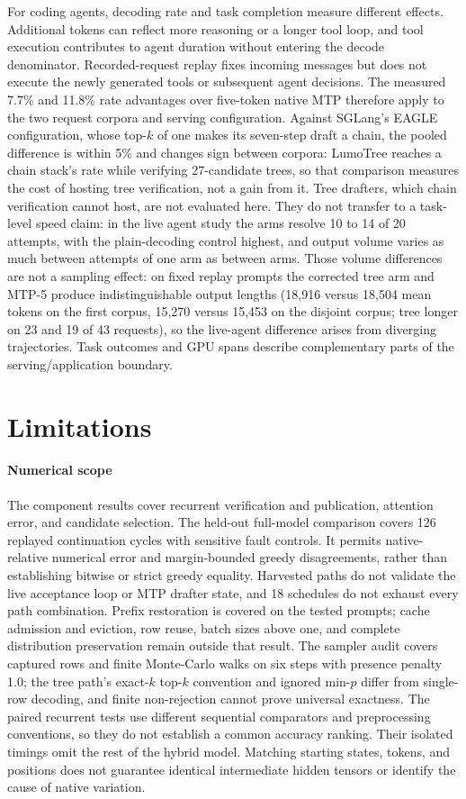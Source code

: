 \documentclass[conference]{IEEEtran}
\newcommand{\sys}{LumoTree}
\begin{document}
For coding agents, decoding rate and task completion measure different effects. Additional tokens can reflect more reasoning or a longer tool loop, and tool execution contributes to agent duration without entering the decode denominator. Recorded-request replay fixes incoming messages but does not execute the newly generated tools or subsequent agent decisions. The measured 7.7\% and 11.8\% rate advantages over five-token native MTP therefore apply to the two request corpora and serving configuration. Against SGLang's EAGLE configuration, whose top-$k$ of one makes its seven-step draft a chain, the pooled difference is within 5\% and changes sign between corpora: \sys{} reaches a chain stack's rate while verifying 27-candidate trees, so that comparison measures the cost of hosting tree verification, not a gain from it. Tree drafters, which chain verification cannot host, are not evaluated here. They do not transfer to a task-level speed claim: in the live agent study the arms resolve 10 to 14 of 20 attempts, with the plain-decoding control highest, and output volume varies as much between attempts of one arm as between arms. Those volume differences are not a sampling effect: on fixed replay prompts the corrected tree arm and MTP-5 produce indistinguishable output lengths (18,916 versus 18,504 mean tokens on the first corpus, 15,270 versus 15,453 on the disjoint corpus; tree longer on 23 and 19 of 43 requests), so the live-agent difference arises from diverging trajectories. Task outcomes and GPU spans describe complementary parts of the serving/application boundary.

\section{Limitations}
\label{sec:limitations}
\paragraph{Numerical scope}
The component results cover recurrent verification and publication, attention error, and candidate selection. The held-out full-model comparison covers 126 replayed continuation cycles with sensitive fault controls. It permits native-relative numerical error and margin-bounded greedy disagreements, rather than establishing bitwise or strict greedy equality. Harvested paths do not validate the live acceptance loop or MTP drafter state, and 18 schedules do not exhaust every path combination. Prefix restoration is covered on the tested prompts; cache admission and eviction, row reuse, batch sizes above one, and complete distribution preservation remain outside that result. The sampler audit covers captured rows and finite Monte-Carlo walks on six steps with presence penalty 1.0; the tree path's exact-$k$ top-$k$ convention and ignored min-$p$ differ from single-row decoding, and finite non-rejection cannot prove universal exactness. The paired recurrent tests use different sequential comparators and preprocessing conventions, so they do not establish a common accuracy ranking. Their isolated timings omit the rest of the hybrid model. Matching starting states, tokens, and positions does not guarantee identical intermediate hidden tensors or identify the cause of native variation.
\end{document}
